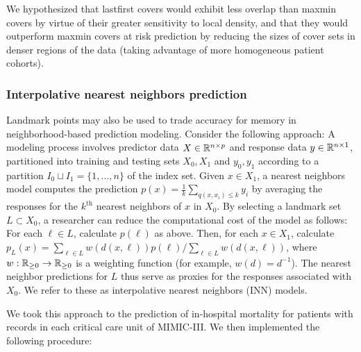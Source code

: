 \documentclass{article}
\begin{document}
We hypothesized that lastfirst covers would exhibit less overlap than
maxmin covers by virtue of their greater sensitivity to local density,
and that they would outperform maxmin covers at risk prediction by
reducing the sizes of cover sets in denser regions of the data (taking
advantage of more homogeneous patient cohorts).

\hypertarget{interpolative-nearest-neighbors-prediction}{%
\subsubsection{Interpolative nearest neighbors
prediction}\label{interpolative-nearest-neighbors-prediction}}

Landmark points may also be used to trade accuracy for memory in
neighborhood-based prediction modeling. Consider the following approach:
A modeling process involves predictor data \(X \in \mathbb{R}^{n \times p}\) and
response data \(y \in \mathbb{R}^{n \times 1}\), partitioned into training and
testing sets \(X_0,X_1\) and \(y_0,y_1\) according to a partition
\(I_0 \sqcup I_1 = \{1,\ldots,n\}\) of the index set. Given
\(x \in X_1\), a nearest neighbors model computes the prediction
\(p(x) = \frac{1}{k}\sum_{q(x,x_i) \leq k}{y_i}\) by averaging the
responses for the \(k^\text{th}\) nearest neighbors of \(x\) in \(X_0\).
By selecting a landmark set \(L \subset X_0\), a researcher can reduce
the computational cost of the model as follows: For each \(\ell \in L\),
calculate \(p(\ell)\) as above. Then, for each \(x \in X_1\), calculate
\(p_L(x) = \sum_{\ell \in L}{w(d(x,\ell)) p(\ell)} / \sum_{\ell \in L}{w(d(x,\ell))}\),
where \(w : \mathbb{R}_{\geq 0} \to \mathbb{R}_{\geq 0}\) is a weighting function (for
example, \(w(d)=d^{-1}\)). The nearest neighbor predictions for \(L\)
thus serve as proxies for the responses associated with \(X_0\). We
refer to these as interpolative nearest neighbors (INN) models.

We took this approach to the prediction of in-hospital mortality for
patients with records in each critical care unit of MIMIC-III. We then
implemented the following procedure:
\end{document}
